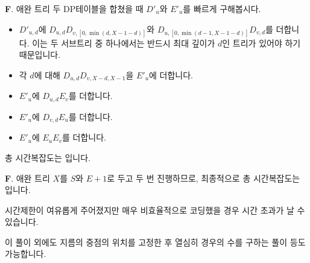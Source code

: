 \begin{frame}{\textbf{F}. 애완 트리}
    두 DP테이블을 합쳤을 때 $D'_u$와 $E'_u$를 빠르게 구해봅시다.
    \begin{itemize}
        \item $D'_{u,d}$에 $D_{u,d}D_{v,[0,\min\left(d,X-1-d\right)]}$와 $D_{u,[0,\min\left(d-1,X-1-d\right)]}D_{v,d}$를 더합니다. 이는 두 서브트리 중 하나에서는 반드시 최대 깊이가 $d$인 트리가 있어야 하기 때문입니다.
        \item 각 $d$에 대해 $D_{u,d}D_{v,X-d,X-1}$을 $E'_u$에 더합니다.
        \item $E'_u$에 $D_{u,d}E_v$를 더합니다.
        \item $E'_u$에 $D_{v,d}E_u$를 더합니다.
        \item $E'_u$에 $E_u E_v$를 더합니다.
        
    \end{itemize}
    총 시간복잡도는 입니다.
\end{frame}

\begin{frame}{\textbf{F}. 애완 트리}
    $X$를 $S$와 $E+1$로 두고 두 번 진행하므로, 최종적으로 총 시간복잡도는 입니다.
    
    시간제한이 여유롭게 주어졌지만 매우 비효율적으로 코딩했을 경우 시간 초과가 날 수 있습니다.
    
    이 풀이 외에도 지름의 중점의 위치를 고정한 후 열심히 경우의 수를 구하는 풀이 등도 가능합니다.
\end{frame}